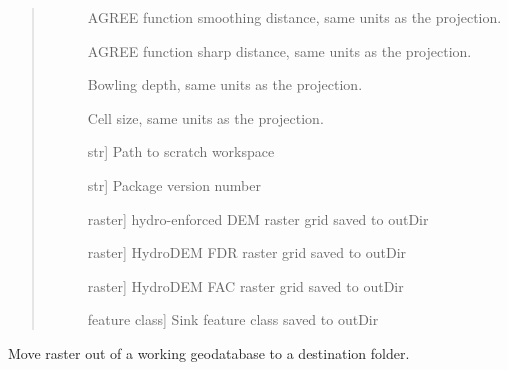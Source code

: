 \documentclass[letterpaper,10pt,english]{sphinxmanual}
\begin{document}
\begin{fulllineitems}
\begin{quote}
\begin{description}
\begin{description}
\item[{}] \leavevmode
AGREE function smoothing distance, same units as the projection.

\item[{}] \leavevmode
AGREE function sharp distance, same units as the projection.

\item[{}] \leavevmode
Bowling depth, same units as the projection.

\item[{}] \leavevmode
Cell size, same units as the projection.

\item[{}] \leavevmode{[}str{]}
Path to scratch workspace

\item[{}] \leavevmode{[}str{]}
Package version number

\item[{}] \leavevmode
\item[{}] \leavevmode
\item[{}] \leavevmode{[}raster{]}
hydro-enforced DEM raster grid saved to outDir

\item[{}] \leavevmode{[}raster{]}
HydroDEM FDR raster grid saved to outDir

\item[{}] \leavevmode{[}raster{]}
HydroDEM FAC raster grid saved to outDir

\item[{}] \leavevmode{[}feature class{]}
Sink feature class saved to outDir

\end{description}

\end{description}\end{quote}

\end{fulllineitems}


\begin{fulllineitems}
\label{\detokenize{make_hydrodem:make_hydrodem.moveRasters}}
Move raster out of a working geodatabase to a destination folder.

\end{fulllineitems}
\end{document}
